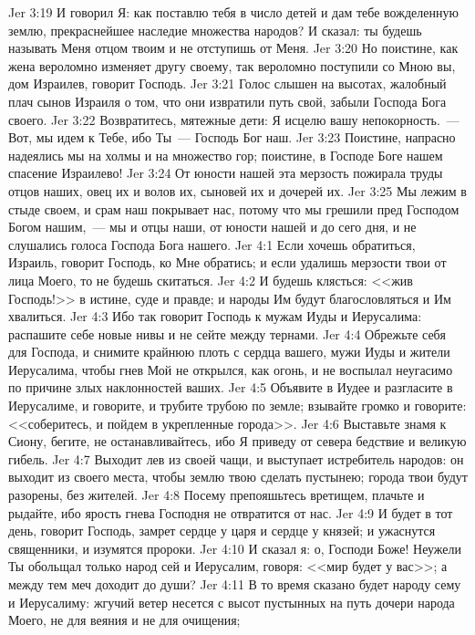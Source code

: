 \vs Jer 3:19 И говорил Я: как поставлю тебя в число детей и дам тебе вожделенную землю, прекраснейшее наследие множества народов? И сказал: ты будешь называть Меня отцом твоим и не отступишь от Меня.
\vs Jer 3:20 Но поистине, как жена вероломно изменяет другу своему, так вероломно поступили со Мною вы, дом Израилев, говорит Господь.
\vs Jer 3:21 Голос слышен на высотах, жалобный плач сынов Израиля о том, что они извратили путь свой, забыли Господа Бога своего.
\vs Jer 3:22 Возвратитесь, мятежные дети: Я исцелю вашу непокорность.~--- Вот, мы идем к Тебе, ибо Ты~--- Господь Бог наш.
\vs Jer 3:23 Поистине, напрасно надеялись мы на холмы и на множество гор; поистине, в Господе Боге нашем спасение Израилево!
\vs Jer 3:24 От юности нашей эта мерзость пожирала труды отцов наших, овец их и волов их, сыновей их и дочерей их.
\vs Jer 3:25 Мы лежим в стыде своем, и срам наш покрывает нас, потому что мы грешили пред Господом Богом нашим,~--- мы и отцы наши, от юности нашей и до сего дня, и не слушались голоса Господа Бога нашего.
\vs Jer 4:1 Если хочешь обратиться, Израиль, говорит Господь, ко Мне обратись; и если удалишь мерзости твои от лица Моего, то не будешь скитаться.
\vs Jer 4:2 И будешь клясться: <<жив Господь!>> в истине, суде и правде; и народы Им будут благословляться и Им хвалиться.
\vs Jer 4:3 Ибо так говорит Господь к мужам Иуды и Иерусалима: распашите себе новые нивы и не сейте между тернами.
\vs Jer 4:4 Обрежьте себя для Господа, и снимите крайнюю плоть с сердца вашего, мужи Иуды и жители Иерусалима, чтобы гнев Мой не открылся, как огонь, и не воспылал неугасимо по причине злых наклонностей ваших.
\vs Jer 4:5 Объявите в Иудее и разгласите в Иерусалиме, и говорите, и трубите трубою по земле; взывайте громко и говорите: <<соберитесь, и пойдем в укрепленные города>>.
\vs Jer 4:6 Выставьте знамя к Сиону, бегите, не останавливайтесь, ибо Я приведу от севера бедствие и великую гибель.
\vs Jer 4:7 Выходит лев из своей чащи, и выступает истребитель народов: он выходит из своего места, чтобы землю твою сделать пустынею; города твои будут разорены,  без жителей.
\vs Jer 4:8 Посему препояшьтесь вретищем, плачьте и рыдайте, ибо ярость гнева Господня не отвратится от нас.
\rsbpar\vs Jer 4:9 И будет в тот день, говорит Господь, замрет сердце у царя и сердце у князей; и ужаснутся священники, и изумятся пророки.
\vs Jer 4:10 И сказал я: о, Господи Боже! Неужели Ты обольщал только народ сей и Иерусалим, говоря: <<мир будет у вас>>; а между тем меч доходит до души?
\vs Jer 4:11 В то время сказано будет народу сему и Иерусалиму: жгучий ветер несется с высот пустынных на путь дочери народа Моего, не для веяния и не для очищения;
